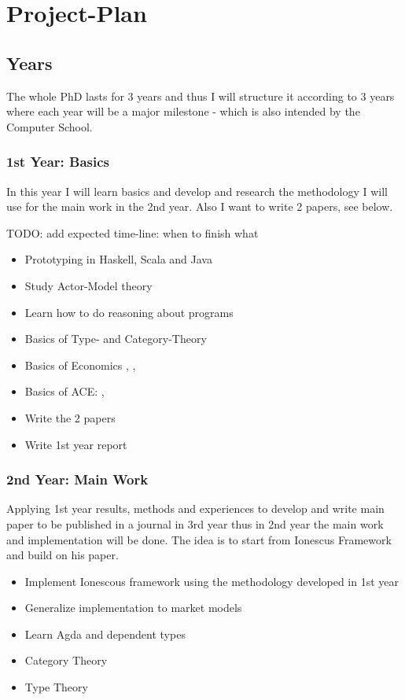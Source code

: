 \section{Project-Plan}

\subsection{Years}
The whole PhD lasts for 3 years and thus I will structure it according to 3 years where each year will be a major milestone - which is also intended by the Computer School.

\subsubsection{1st Year: Basics}
In this year I will learn basics and develop and research the methodology I will use for the main work in the 2nd year. Also I want to write 2 papers, see below.

TODO: add expected time-line: when to finish what

\begin{itemize}
\item Prototyping in Haskell, Scala and Java
\item Study Actor-Model theory
\item Learn how to do reasoning about programs
\item Basics of Type- and Category-Theory \cite{Pierce1991} \cite{TODO: category theory for the sciences}
\item Basics of Economics \cite{bowles_understanding_2005}, \cite{LehalleLaruelle2013}, \cite{baker_market_2013}
\item Basics of ACE: \cite{KirmanComplex2010}, \cite{Darley2007}
\item Write the 2 papers
\item Write 1st year report
\end{itemize}

\subsubsection{2nd Year: Main Work}
Applying 1st year results, methods and experiences to develop and write main paper to be published in a journal in 3rd year thus in 2nd year the main  work and implementation will be done. The idea is to start from Ionescus Framework \cite{Botta20114025} and build on his paper.

\begin{itemize}
\item Implement Ionescous framework using the methodology developed in 1st year
\item Generalize implementation to market models
\item Learn Agda and dependent types
\item Category Theory
\item Type Theory
\end{itemize}

